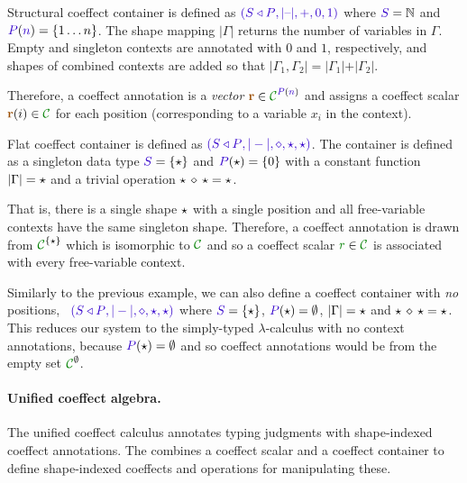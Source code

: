 \begin{example}
\label{ex:further-struct-shape}
Structural coeffect container is defined as $\sclrd{(\SHP, {|}\textnormal{--}{|}, +, 0, 1)}$
where $\SH=\mathbb{N}$ and $\SP(\sclrd{n})=\{ 1 \ldots n \}$. The shape mapping ${|}\Gamma{|}$ returns the
number of variables in $\Gamma$. Empty and singleton contexts are annotated with $0$ and $1$,
respectively, and shapes of combined contexts are added so that ${|}\Gamma_1, \Gamma_2{|} =
{|}\Gamma_1{|} + {|}\Gamma_2{|}$.

Therefore, a coeffect annotation is a \emph{vector}
$\aclrd{\textbf{r}} \in \C^{\SP(\sclrd{n})}$ and assigns a coeffect scalar $\aclrd{\textbf{r}}(i) \in \C$
for each position (corresponding to a variable $x_i$ in the context).
\end{example}

\begin{example}
\label{ex:further-flat-shape}
Flat coeffect container is defined as $\sclrd{(\SHP, {|}-{|}, \diamond, \sflat, \sflat)}$.
The container is defined as a singleton data type $\SH = \{\sflat \}$ and $\SP(\sflat) = \{ 0 \}$
with a constant function ${|}\Gamma{|}=\star$ and a trivial operation $\star\,\diamond\,\star = \star$.

That is, there is a single shape
$\star$ with a single position and all free-variable contexts have the same singleton shape.
Therefore, a coeffect annotation is drawn from $\C^{\{\sflat\}}$ which is isomorphic to $\C$
and so a coeffect scalar $\cclrd{r}\in \C$ is associated with every free-variable context.
\end{example}

\begin{example}
Similarly to the previous example, we can also define a coeffect container with \emph{no} positions,
\ie~$\sclrd{(\SHP, {|}-{|}, \diamond, \sflat, \sflat)}$ where $\SH = \{\sflat \}$, $\SP(\sflat) = \emptyset$,
${|}\Gamma{|}=\star$ and $\star\,\diamond\,\star = \star$.
This reduces our system to the simply-typed $\lambda$-calculus with no context annotations, because
$\SP(\sflat)=\emptyset$ and so coeffect annotations would be from the empty set $\C^\emptyset$.
\end{example}


\paragraph{Unified coeffect algebra.}
The unified coeffect calculus annotates typing judgments with shape-indexed coeffect annotations.
The \emph{} combines a coeffect scalar and a coeffect container
to define shape-indexed coeffects and operations for manipulating these.

